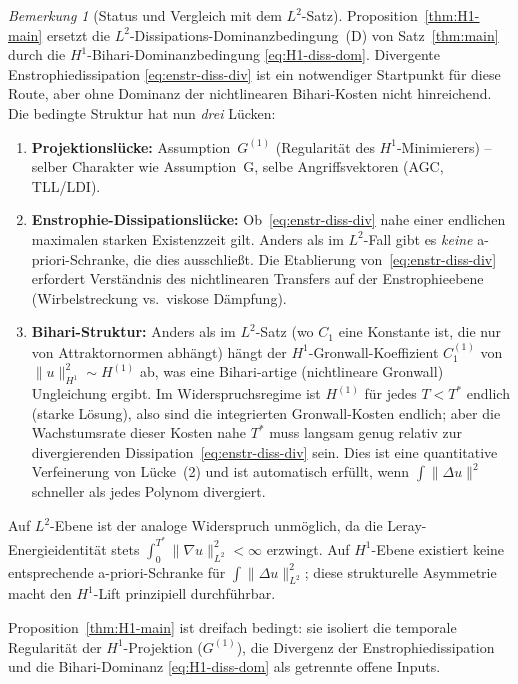 \documentclass[12pt,a4paper]{article}
\theoremstyle{definition}
\theoremstyle{plain}
\theoremstyle{remark}
\newtheorem{remark}[definition]{Bemerkung}
\begin{document}
\begin{remark}[Status und Vergleich mit dem $L^2$-Satz]
\label{rem:H1-comparison}
Proposition~\ref{thm:H1-main} ersetzt die $L^2$-Dissipations-Dominanzbedingung~(D)
von Satz~\ref{thm:main} durch die $H^1$-Bihari-Dominanzbedingung
\eqref{eq:H1-diss-dom}. Divergente Enstrophiedissipation
\eqref{eq:enstr-diss-div} ist ein notwendiger Startpunkt für diese Route,
aber ohne Dominanz der nichtlinearen Bihari-Kosten nicht hinreichend.
Die bedingte Struktur hat nun \emph{drei} Lücken:
\begin{enumerate}
  \item \textbf{Projektionslücke:}\; Assumption~$G^{(1)}$
    (Regularität des $H^1$-Minimierers) -- selber Charakter wie
    Assumption~G, selbe Angriffsvektoren (AGC, TLL/LDI).
  \item \textbf{Enstrophie-Dissipationslücke:}\;
    Ob~\eqref{eq:enstr-diss-div} nahe einer endlichen maximalen starken
    Existenzzeit gilt.
    Anders als im $L^2$-Fall gibt es \emph{keine} a-priori-Schranke,
    die dies ausschließt. Die Etablierung von~\eqref{eq:enstr-diss-div}
    erfordert Verständnis des nichtlinearen Transfers auf der
    Enstrophieebene (Wirbelstreckung vs.\ viskose Dämpfung).
  \item \textbf{Bihari-Struktur:}\;
    Anders als im $L^2$-Satz (wo $C_1$ eine Konstante ist, die nur
    von Attraktornormen abhängt) hängt der $H^1$-Gronwall-Koeffizient
    $C_1^{(1)}$ von $\|u\|_{H^1}^2 \sim H^{(1)}$ ab, was eine
    Bihari-artige (nichtlineare Gronwall) Ungleichung ergibt.
    Im Widerspruchsregime ist $H^{(1)}$ für jedes $T < T^*$ endlich
    (starke Lösung), also sind die integrierten Gronwall-Kosten endlich;
    aber die Wachstumsrate dieser Kosten nahe $T^*$ muss langsam genug
    relativ zur divergierenden Dissipation~\eqref{eq:enstr-diss-div} sein.
    Dies ist eine quantitative Verfeinerung von Lücke~(2) und ist automatisch
    erfüllt, wenn $\int\|\Delta u\|^2$ schneller als jedes Polynom divergiert.
\end{enumerate}
Auf $L^2$-Ebene ist der analoge Widerspruch unmöglich, da die
Leray-Energieidentität stets
$\int_0^{T^*}\|\nabla u\|_{L^2}^2 < \infty$ erzwingt.
Auf $H^1$-Ebene existiert keine entsprechende a-priori-Schranke für
$\int\|\Delta u\|_{L^2}^2$; diese strukturelle Asymmetrie
macht den $H^1$-Lift prinzipiell durchführbar.

Proposition~\ref{thm:H1-main} ist dreifach bedingt: sie isoliert
die temporale Regularität der $H^1$-Projektion ($G^{(1)}$), die
Divergenz der Enstrophiedissipation und die Bihari-Dominanz
\eqref{eq:H1-diss-dom} als getrennte offene Inputs.


\end{remark}
\end{document}
